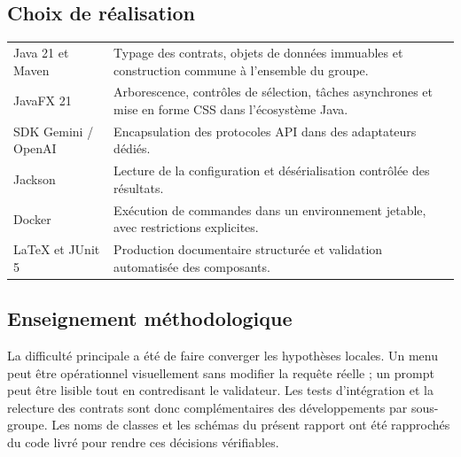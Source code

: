 \subsection{Choix de réalisation}
\begin{tabularx}{\textwidth}{@{}P{35mm}Y@{}}
\toprule
{} & \\
\midrule
Java 21 et Maven & Typage des contrats, objets de données immuables et construction commune à l'ensemble du groupe.\\
JavaFX 21 & Arborescence, contrôles de sélection, tâches asynchrones et mise en forme CSS dans l'écosystème Java.\\
SDK Gemini / OpenAI & Encapsulation des protocoles API dans des adaptateurs dédiés.\\
Jackson & Lecture de la configuration et désérialisation contrôlée des résultats.\\
Docker & Exécution de commandes dans un environnement jetable, avec restrictions explicites.\\
LaTeX et JUnit 5 & Production documentaire structurée et validation automatisée des composants.\\
\bottomrule
\end{tabularx}

\subsection{Enseignement méthodologique}
La difficulté principale a été de faire converger les hypothèses locales. Un menu peut être opérationnel visuellement sans modifier la requête réelle ; un prompt peut être lisible tout en contredisant le validateur. Les tests d'intégration et la relecture des contrats sont donc complémentaires des développements par sous-groupe. Les noms de classes et les schémas du présent rapport ont été rapprochés du code livré pour rendre ces décisions vérifiables.

\clearpage
